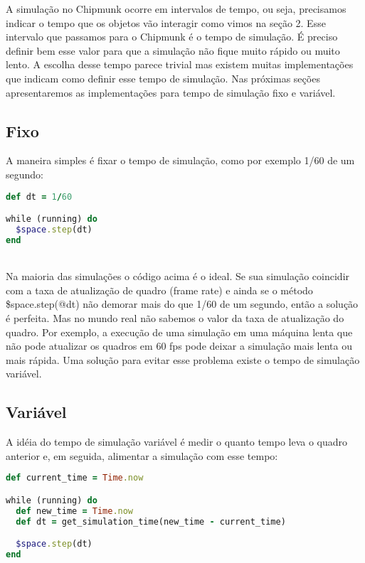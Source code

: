 A simulação no Chipmunk ocorre em intervalos de tempo, ou seja, precisamos indicar o tempo que os objetos vão interagir como vimos na seção 2. 
Esse intervalo que passamos para o Chipmunk é o tempo de simulação. É preciso definir bem esse valor para que a simulação não fique muito rápido 
ou muito lento. A escolha desse tempo parece trivial mas existem muitas implementações que indicam como definir esse tempo de simulação. Nas 
próximas seções apresentaremos as implementações para tempo de simulação fixo e variável.

\subsection{Fixo}

A maneira simples é fixar o tempo de simulação, como por exemplo 1/60 de um segundo:

\begin{lstlisting}[language=Ruby, caption=Implementação de tempo de simulação fixo]
def dt = 1/60

while (running) do
  $space.step(dt)
end
\end{lstlisting}

\ \\
Na maioria das simulações o código acima é o ideal. Se sua simulação coincidir com a taxa de atualização de quadro (frame rate) 
e ainda se o método \$space.step(@dt) não demorar mais do que 1/60 de um segundo, então a solução é perfeita. Mas no mundo real não sabemos
o valor da taxa de atualização do quadro. Por exemplo, a execução de uma simulação em uma máquina lenta que não pode atualizar os quadros em 60 fps 
pode deixar a simulação mais lenta ou mais rápida. Uma solução para evitar esse problema existe o tempo de simulação variável.

\subsection{Variável}

A idéia do tempo de simulação variável é medir o quanto tempo leva o quadro anterior e, em seguida, alimentar a simulação com esse tempo: 

\begin{lstlisting}[language=Ruby, caption=Implementação de tempo de simulação variável]
def current_time = Time.now

while (running) do
  def new_time = Time.now
  def dt = get_simulation_time(new_time - current_time)

  $space.step(dt)
end

\end{lstlisting}

